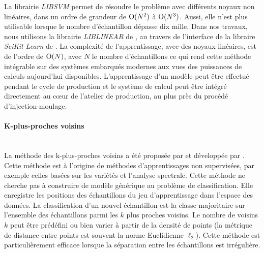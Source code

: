 La librairie \textit{LIBSVM} \cite{chang_libsvm_2011} permet de résoudre le problème avec différents noyaux non linéaires, dans un ordre de grandeur de $\operatorname{O}(N^2)$ à $\operatorname{O}(N^3)$.
Aussi, elle n'est plus utilisable lorsque le nombre d'échantillon dépasse dix mille.
Dans nos travaux, nous utilisons la librairie \textit{LIBLINEAR} de \citeauthor{fan_liblinear_2008} \cite{fan_liblinear_2008}, au travers de l'interface de la libraire \textit{SciKit-Learn} de \citeauthor{pedregosa_scikit-learn_2011} \cite{pedregosa_scikit-learn_2011}.
La complexité de l'apprentissage, avec des noyaux linéaires, est de l'ordre de $\operatorname{O}(N)$, avec $N$ le nombre d'échantillons ce qui rend cette méthode intégrable sur des systèmes embarqués modernes aux vues des puissances de calculs aujourd'hui disponibles.
L'apprentissage d'un modèle peut être effectué pendant le cycle de production et le système de calcul peut être intégré directement au cœur de l'atelier de production, au plus près du procédé d'injection-moulage.

\paragraph{K-plus-proches voisins} \mbox{} \label{parag:knn} \\
La méthode des k-plus-proches voisins a été proposée par \citeauthor{fix_discriminatory_1951} \cite{fix_discriminatory_1951} et développée par \citeauthor{cover_nearest_1967} \cite{cover_nearest_1967}.
Cette méthode est à l'origine de méthodes d'apprentissages non supervisées, par exemple celles basées sur les variétés et l'analyse spectrale.
Cette méthode ne cherche pas à construire de modèle générique au problème de classification.
Elle enregistre les positions des échantillons du jeu d'apprentissage dans l'espace des données.
La classification d'un nouvel échantillon est la classe majoritaire sur l'ensemble des échantillons parmi les $k$ plus proches voisins.
Le nombre de voisins $k$ peut être prédéfini ou bien varier à partir de la densité  de points (la métrique de distance entre points est souvent la norme Euclidienne $\ell_{2}$).
Cette méthode est particulièrement efficace lorsque la séparation entre les échantillons est irrégulière.


